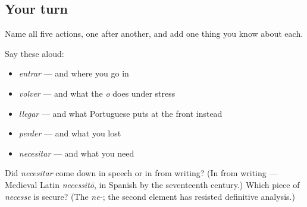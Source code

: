 \subsection*{Your turn}
Name all five actions, one after another, and add one thing you know about each.

Say these aloud:

\begin{itemize}
\raggedright
  \item \emph{entrar} — and where you go in
  \item \emph{volver} — and what the \emph{o} does under stress
  \item \emph{llegar} — and what Portuguese puts at the front instead
  \item \emph{perder} — and what you lost
  \item \emph{necesitar} — and what you need
\end{itemize}

\begin{tcolorbox}[breakable,colback=teal!4,colframe=teal!35!black,title={Before you move on}]
Did \emph{necesitar} come down in speech or in from writing? (In from writing — Medieval Latin \emph{necessitō}, in Spanish by the seventeenth century.) Which piece of \emph{necesse} is secure? (The \emph{ne-}; the second element has resisted definitive analysis.)
\end{tcolorbox}
